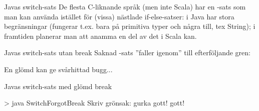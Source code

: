 \begin{Slide}{Javas switch-sats}\SlideFontSmall
De flesta C-liknande språk (men inte Scala) har en -sats som man kan använda istället för (vissa) nästlade if-else-satser:
{\SlideFontTiny
{} i Java har stora begränsningar (fungerar t.ex. bara på primitiva typer och några till, tex String); i framtiden planerar man att anamma en del av det  i Scala kan.
}
\end{Slide}


\begin{Slide}{Javas switch-sats utan break}\SlideFontSmall
Saknad -sats ''faller igenom'' till efterföljande gren:

En glömd  kan ge svårhittad bugg...
\end{Slide}

\begin{Slide}{Javas switch-sats med glömd break}\SlideFontSmall

\vspace{-0.5em}

\vspace{-0.7em}\pause
\begin{REPL}
> java SwitchForgotBreak
Skriv grönsak:
gurka
gott!
gott!
\end{REPL}

\end{Slide}


